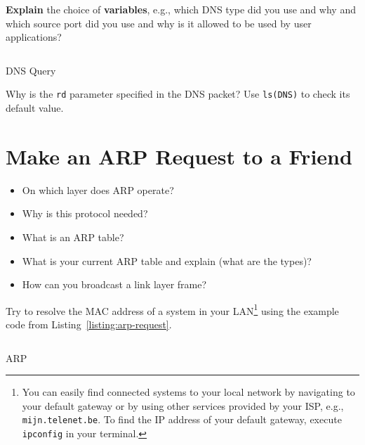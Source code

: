 \documentclass[11pt,a4paper]{article}
\begin{document}
\begin{question}
    \textbf{Explain} the choice of \textbf{variables}, e.g., which DNS type did you use and why and which source port did you use and why is it allowed to be used by user applications?
\end{question}


\begin{listing}[h]
\inputminted[firstline=16]{python}{../code_students/dns_query.py}
\caption{DNS Query}\label{listing:dns-query}
\end{listing}

\begin{question}
    Why is the \texttt{rd} parameter specified in the DNS packet? Use \texttt{ls(DNS)} to check its default value.
\end{question}



\FloatBarrier
\section{Make an ARP Request to a Friend}
\begin{question}
\begin{itemize}
    \item On which layer does ARP operate?
    \item Why is this protocol needed?
    \item What is an ARP table?
    \item What is your current ARP table and explain (what are the types)?
    \item How can you broadcast a link layer frame?
\end{itemize}
\end{question}

\begin{question}
Try to resolve the MAC address of a system in your LAN\footnote{You can easily find connected systems to your local network by navigating to your default gateway or by using other services provided by your ISP, e.g., \texttt{mijn.telenet.be}. To find the IP address of your default gateway, execute  \texttt{ipconfig} in your terminal.} using the example code from Listing~\ref{listing:arp-request}.
\end{question}



\begin{listing}[h]
    \inputminted{python}{../code_students/example-arp.py}
\caption{ARP}\label{listing:arp-request}
\end{listing}
\end{document}
